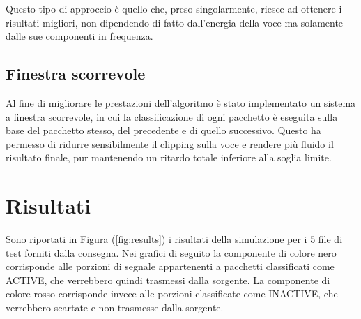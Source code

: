 \documentclass[10pt,twocolumn]{article}
\begin{document}
{Questo tipo di approccio è quello che, preso singolarmente, riesce ad ottenere i risultati migliori, non dipendendo di fatto dall'energia della voce ma solamente dalle sue componenti in frequenza. 

\subsection{Finestra scorrevole}
Al fine di migliorare le prestazioni dell'algoritmo è stato implementato un sistema a finestra scorrevole,
in cui la classificazione di ogni pacchetto è eseguita sulla base del pacchetto stesso, del precedente e di quello successivo. Questo ha permesso di ridurre sensibilmente il clipping sulla voce e rendere più
fluido il risultato finale, pur mantenendo un ritardo totale inferiore alla soglia limite. 

\section{Risultati}
{Sono riportati in Figura (\ref{fig:results}) i risultati della simulazione per i 5 file di test forniti dalla consegna. Nei grafici di seguito la componente di colore nero corrisponde alle porzioni di segnale appartenenti a pacchetti classificati come ACTIVE, che verrebbero quindi trasmessi dalla sorgente. La componente di colore rosso corrisponde invece alle porzioni classificate come INACTIVE, che verrebbero scartate e non trasmesse dalla sorgente.}

}
\end{document}
